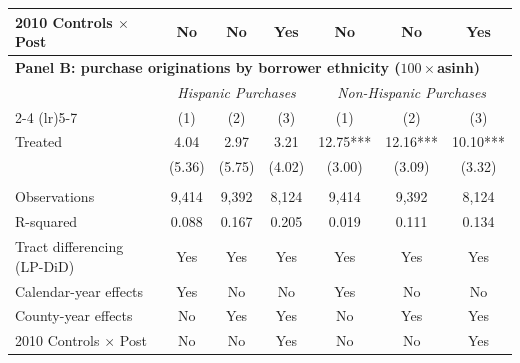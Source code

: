 \begin{table}[H]
{\begin{tabular}{lcccccc}
    2010 Controls $\times$ Post & No & No & Yes & No & No & Yes \\
\midrule
\multicolumn{7}{l}{\textbf{Panel B: purchase originations by borrower ethnicity ($100\times$asinh)}} \\
 & \multicolumn{3}{c}{\textit{Hispanic Purchases}} & \multicolumn{3}{c}{\textit{Non-Hispanic Purchases}} \\
\cmidrule(lr){2-4} \cmidrule(lr){5-7}
 & (1) & (2) & (3) & (1) & (2) & (3) \\
\midrule
    Treated & 4.04 & 2.97 & 3.21 & 12.75*** & 12.16*** & 10.10*** \\
 & (5.36) & (5.75) & (4.02) & (3.00) & (3.09) & (3.32) \\
 & & & & & & \\
    Observations & 9,414 & 9,392 & 8,124 & 9,414 & 9,392 & 8,124 \\
    R-squared & 0.088 & 0.167 & 0.205 & 0.019 & 0.111 & 0.134 \\
    Tract differencing (LP-DiD) & Yes & Yes & Yes & Yes & Yes & Yes \\
    Calendar-year effects & Yes & No & No & Yes & No & No \\
    County-year effects & No & Yes & Yes & No & Yes & Yes \\
    2010 Controls $\times$ Post & No & No & Yes & No & No & Yes \\
\midrule\bottomrule
\end{tabular}
}
\label{tab:controls_robustness}
\end{table}
